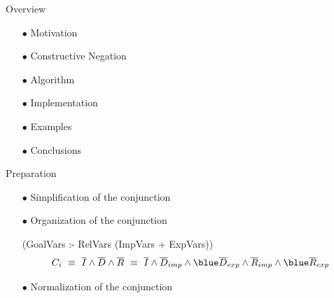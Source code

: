 \documentclass[pdf,slideColor,contemporain]{prosper}
\begin{document}
\begin{slide}{Overview}
\vspace{0.8cm}
        \begin{itemize}
                \item[{\blue $\bullet$}] Motivation
                \item[{\blue $\bullet$}] Constructive Negation
                \item[$\bullet$] {\blue Algorithm}
                \item[{\blue $\bullet$}] Implementation
                \item[{\blue $\bullet$}] Examples
                \item[{\blue $\bullet$}] Conclusions
        \end{itemize}
\end{slide}

\begin{slide}{Preparation}
     \begin{itemize}
        \item[$\bullet$] {\blue Simplification} of the conjunction
        \item[$\bullet$] {\blue Organization} of the conjunction

{\small                      (GoalVars :- RelVars (ImpVars + ExpVars))}
\[ C_i~ \equiv ~\overline{I} \wedge \overline{D} \wedge \overline{R} ~\equiv ~\overline{I} \wedge \overline{D}_{imp} \wedge  {\blue \overline{D}_{exp}} \wedge \overline{R}_{imp} \wedge  {\blue \overline{R}_{exp}} \]
        \item[$\bullet$] {\blue Normalization} of the conjunction \\
     \end{itemize}
\end{slide}
\end{document}
